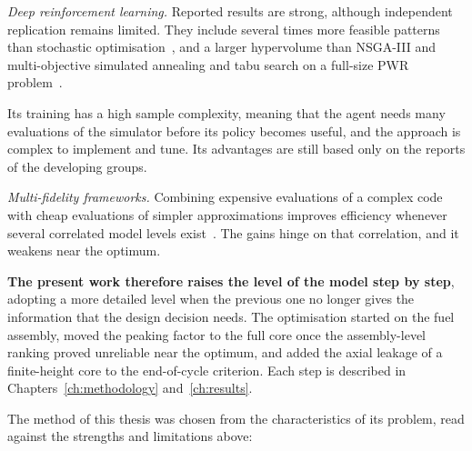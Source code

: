 \emph{Deep reinforcement learning.} Reported results are strong, although
independent replication remains limited. They
include several times more feasible patterns than stochastic
optimisation~\cite{radaideh_2021_rl}, and a larger hypervolume than
NSGA-III and multi-objective simulated annealing and tabu search on a
full-size PWR problem~\cite{seurin_2024_pearl}.

Its training has a high sample complexity, meaning that the agent needs
many evaluations of the simulator before its policy becomes useful, and
the approach is complex to implement and tune. Its advantages are still based only on the reports of the developing groups.

\emph{Multi-fidelity frameworks.} Combining expensive evaluations of a complex
code with cheap evaluations of simpler approximations improves efficiency
whenever several correlated model levels
exist~\cite{kennedy_ohagan_2000}. The gains hinge on that correlation,
and it weakens near the optimum.

\textbf{The present work therefore raises the level of the model step by
step},
adopting a more detailed level when the previous one no longer gives the
information that the design decision needs. The optimisation started on
the fuel assembly, moved the peaking factor to the full core once the
assembly-level ranking proved unreliable near the optimum, and added the
axial leakage of a finite-height core to the end-of-cycle criterion. Each
step is described in Chapters~\ref{ch:methodology}
and~\ref{ch:results}.

The method of this thesis was chosen from the characteristics of its
problem, read against the strengths and limitations above:

